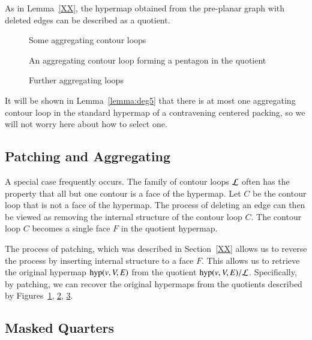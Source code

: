 As in Lemma~\ref{XX}, the hypermap obtained from the
pre-planar graph with deleted edges can be described as a quotient.

\begin{figure}[htb]
  \centering
  \caption{Some aggregating contour loops} %
  \label{fig:agg}
\end{figure}

\begin{figure}[htb]
  \centering
  \caption{An aggregating contour loop forming a pentagon in the quotient}
  \label{fig:tri-pent}
\end{figure}

\begin{figure}[htb]
  \centering
  \caption{Further aggregating loops}
  \label{fig:degree6}
\end{figure}



It will be shown in
Lemma~\ref{lemma:deg5} that there is at most one aggregating
contour loop in the standard hypermap of a contravening centered packing,
so we will not worry here about how to select one.




\subsection{Patching and Aggregating}

A special case frequently occurs.  The family of contour loops
$\cal L$ often has the property that all but one contour is
a face of the hypermap.  Let $C$ be the contour loop that
is not a face of the hypermap.  The process of deleting an
edge can then be viewed as removing the internal structure
of the contour loop $C$.  The contour loop $C$ becomes a single
face $F$ in the quotient hypermap.

The process of patching, which was described in Section~\ref{XX} allows
us to reverse the process by inserting internal structure to
a face $F$.  This allows us to retrieve the original hypermap
${\operatorname{hyp}}(v,V,E)$
from the quotient
${\operatorname{hyp}}(v,V,E)/{\cal L}$.  Specifically, by patching, we can recover
the original hypermaps from the quotients described by
Figures~\ref{fig:agg}, \ref{fig:tri-pent}, \ref{fig:degree6}.

\subsection{Masked Quarters}



